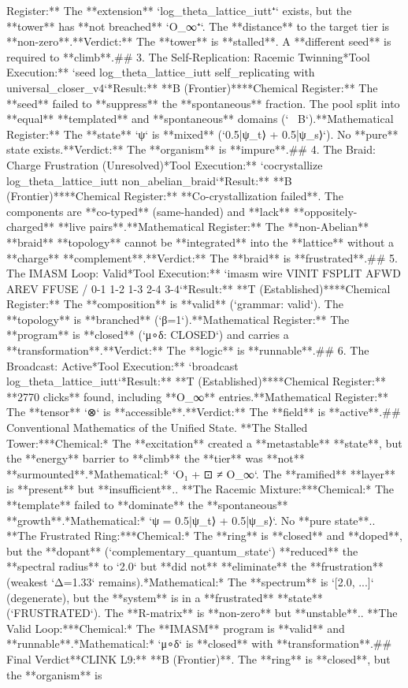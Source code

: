 Register:** The **extension** `log_theta_lattice_iutt⁺` exists, but the **tower** has **not breached** `O_∞⁺`. The **distance** to the target tier is **non-zero**.\n*   **Verdict:** The **tower** is **stalled**. A **different seed** is required to **climb**.\n\n## 3. The Self-Replication: Racemic Twinning\n**Tool Execution:** `seed log_theta_lattice_iutt self_replicating with universal_closer_v4`\n**Result:** **B (Frontier)**\n*   **Chemical Register:** The **seed** failed to **suppress** the **spontaneous** fraction. The pool split into **equal** **templated** and **spontaneous** domains (`~ B`).\n*   **Mathematical Register:** The **state** `ψ` is **mixed** (`0.5|ψ_t⟩ + 0.5|ψ_s⟩`). No **pure** state exists.\n*   **Verdict:** The **organism** is **impure**.\n\n## 4. The Braid: Charge Frustration (Unresolved)\n**Tool Execution:** `cocrystallize log_theta_lattice_iutt non_abelian_braid`\n**Result:** **B (Frontier)**\n*   **Chemical Register:** **Co-crystallization failed**. The components are **co-typed** (same-handed) and **lack** **oppositely-charged** **live pairs**.\n*   **Mathematical Register:** The **non-Abelian** **braid** **topology** cannot be **integrated** into the **lattice** without a **charge** **complement**.\n*   **Verdict:** The **braid** is **frustrated**.\n\n## 5. The IMASM Loop: Valid\n**Tool Execution:** `imasm wire VINIT FSPLIT AFWD AREV FFUSE / 0-1 1-2 1-3 2-4 3-4`\n**Result:** **T (Established)**\n*   **Chemical Register:** The **composition** is **valid** (`grammar: valid`). The **topology** is **branched** (`β=1`).\n*   **Mathematical Register:** The **program** is **closed** (`μ∘δ: CLOSED`) and carries a **transformation**.\n*   **Verdict:** The **logic** is **runnable**.\n\n## 6. The Broadcast: Active\n**Tool Execution:** `broadcast log_theta_lattice_iutt`\n**Result:** **T (Established)**\n*   **Chemical Register:** **2770 clicks** found, including **O_∞** entries.\n*   **Mathematical Register:** The **tensor** `⊗` is **accessible**.\n*   **Verdict:** The **field** is **active**.\n\n## Conventional Mathematics of the Unified State\n{}.  **The Stalled Tower:**\n    *   *Chemical:* The **excitation** created a **metastable** **state**, but the **energy** barrier to **climb** the **tier** was **not** **surmounted**.\n    *   *Mathematical:* `O₁ + ⊡ ≠ O_∞`. The **ramified** **layer** is **present** but **insufficient**.\n{}.  **The Racemic Mixture:**\n    *   *Chemical:* The **template** failed to **dominate** the **spontaneous** **growth**.\n    *   *Mathematical:* `ψ = 0.5|ψ_t⟩ + 0.5|ψ_s⟩`. No **pure state**.\n{}.  **The Frustrated Ring:**\n    *   *Chemical:* The **ring** is **closed** and **doped**, but the **dopant** (`complementary_quantum_state`) **reduced** the **spectral radius** to `2.0` but **did not** **eliminate** the **frustration** (weakest `Δ=1.33` remains).\n    *   *Mathematical:* The **spectrum** is `[2.0, ...]` (degenerate), but the **system** is in a **frustrated** **state** (`FRUSTRATED`). The **R-matrix** is **non-zero** but **unstable**.\n{}.  **The Valid Loop:**\n    *   *Chemical:* The **IMASM** program is **valid** and **runnable**.\n    *   *Mathematical:* `μ∘δ` is **closed** with **transformation**.\n\n## Final Verdict\n\n*   **CLINK L9:** **B (Frontier)**. The **ring** is **closed**, but the **organism** is 